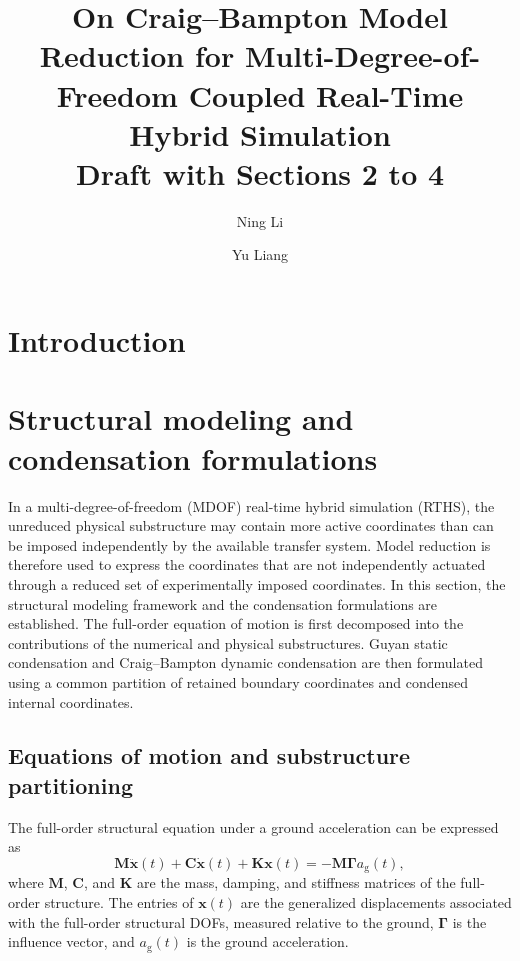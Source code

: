\documentclass[11pt,a4paper]{article}
\title{On Craig--Bampton Model Reduction for Multi-Degree-of-Freedom Coupled Real-Time Hybrid Simulation\\[4pt]
\large Draft with Sections 2 to 4}
\author{Ning Li \and Yu Liang}
\date{}
\numberwithin{equation}{section}
\begin{document}
\maketitle

\begin{abstract}
	
\end{abstract}

\section{Introduction} \label{sec1}



\section{Structural modeling and condensation formulations} \label{sec2}

In a multi-degree-of-freedom (MDOF) real-time hybrid simulation (RTHS), the unreduced physical substructure may contain more active coordinates than can be imposed independently by the available transfer system. Model reduction is therefore used to express the coordinates that are not independently actuated through a reduced set of experimentally imposed coordinates.
In this section, the structural modeling framework and the condensation formulations are established. The full-order equation of motion is first decomposed into the contributions of the numerical and physical substructures. Guyan static condensation and Craig--Bampton dynamic condensation are then formulated using a common partition of retained boundary coordinates and condensed internal coordinates.

\subsection{Equations of motion and substructure partitioning}
The full-order structural equation under a ground acceleration can be expressed as
\begin{equation}
	\mathbf{M}\ddot{\bm{x}}(t)+\mathbf{C}\dot{\bm{x}}(t)+\mathbf{K}\bm{x}(t)
	=-\mathbf{M}\bm{\Gamma}a_{\mathrm{g}}(t),
	\label{eq:full-order-eom}
\end{equation}
where \(\mathbf{M}\), \(\mathbf{C}\), and \(\mathbf{K}\) are the mass, damping, and stiffness matrices of the full-order structure. The entries of \(\bm{x}(t)\) are the generalized displacements associated with the full-order structural DOFs, measured relative to the ground, \(\bm{\Gamma}\) is the influence vector, and \(a_{\mathrm{g}}(t)\) is the ground acceleration.
\end{document}
